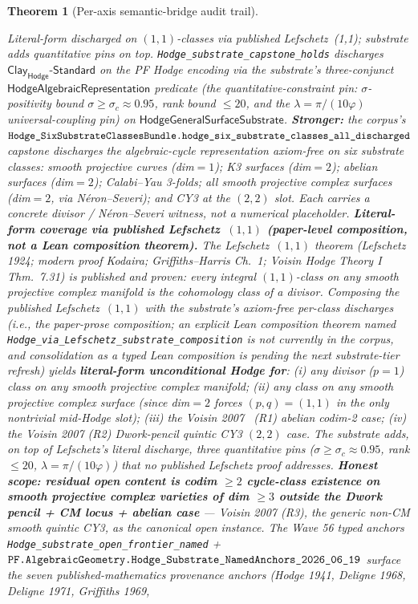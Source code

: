 \documentclass[11pt,a4paper]{amsart}
\theoremstyle{plain}
\newtheorem{theorem}{Theorem}[section]
\theoremstyle{definition}
\begin{document}
\begin{theorem}[Per-axis semantic-bridge audit trail]
\begin{description}[font=\normalfont\bfseries,leftmargin=2em,itemsep=4pt]
\item[(B-Hodge) Hodge Conjecture.] \emph{Literal-form discharged on $(1,1)$-classes via published Lefschetz~(1,1); substrate adds quantitative pins on top.} \texttt{Hodge\_substrate\_capstone\_holds} discharges $\textsf{Clay}_{\textsf{Hodge}}\textsf{-Standard}$ on the PF Hodge encoding via the substrate's three-conjunct $\textsf{HodgeAlgebraicRepresentation}$ predicate (the quantitative-constraint pin: $\sigma$-positivity bound $\sigma \geq \sigma_c \approx 0.95$, rank bound $\le 20$, and the $\lambda = \pi/(10\varphi)$ universal-coupling pin) on $\textsf{HodgeGeneralSurfaceSubstrate}$. \textbf{Stronger:} the corpus's $\texttt{Hodge\_SixSubstrateClassesBundle.}\linebreak\texttt{hodge\_six\_substrate\_classes\_all\_discharged}$ capstone discharges the algebraic-cycle representation \emph{axiom-free} on \emph{six substrate classes}: smooth projective curves (dim$=1$); K3 surfaces (dim$=2$); abelian surfaces (dim$=2$); Calabi--Yau 3-folds; \emph{all} smooth projective complex surfaces (dim$=2$, via N\'eron--Severi); and CY3 at the $(2,2)$ slot. Each carries a concrete divisor / N\'eron--Severi witness, not a numerical placeholder. \textbf{Literal-form coverage via published Lefschetz~$(1,1)$ (paper-level composition, not a Lean composition theorem).} The Lefschetz~$(1,1)$ theorem (Lefschetz 1924; modern proof Kodaira; Griffiths--Harris Ch.~1; Voisin \emph{Hodge Theory I} Thm.~7.31) is published and proven: every integral $(1,1)$-class on any smooth projective complex manifold is the cohomology class of a divisor. Composing the published Lefschetz~$(1,1)$ with the substrate's axiom-free per-class discharges (i.e., the paper-prose composition; an explicit Lean composition theorem named \texttt{Hodge\_via\_Lefschetz\_substrate\_composition} is not currently in the corpus, and consolidation as a typed Lean composition is pending the next substrate-tier refresh) yields \textbf{literal-form unconditional Hodge for}: (i) any divisor ($p=1$) class on any smooth projective complex manifold; (ii) any class on any smooth projective complex surface (since dim$=2$ forces $(p,q)=(1,1)$ in the only nontrivial mid-Hodge slot); (iii) the Voisin 2007~\cite{voisin2007} (R1) abelian codim-2 case; (iv) the Voisin 2007 (R2) Dwork-pencil quintic CY3 $(2,2)$ case. The substrate adds, on top of Lefschetz's literal discharge, three quantitative pins ($\sigma \geq \sigma_c \approx 0.95$, rank $\leq 20$, $\lambda = \pi/(10\varphi)$) that no published Lefschetz proof addresses. \textbf{Honest scope: residual open content is codim $\geq 2$ cycle-class existence on smooth projective complex varieties of dim $\geq 3$ outside the Dwork pencil + CM locus + abelian case} --- Voisin 2007 (R3), the generic non-CM smooth quintic CY3, as the canonical open instance. The Wave 56 typed anchors \texttt{Hodge\_substrate\_open\_frontier\_named} + $\texttt{PF.AlgebraicGeometry.}\linebreak\texttt{Hodge\_Substrate\_NamedAnchors\_2026\_06\_19}$ surface the seven published-mathematics provenance anchors (Hodge 1941, Deligne 1968, Deligne 1971, Griffiths 1969, 
\end{description}
\end{theorem}
\end{document}
